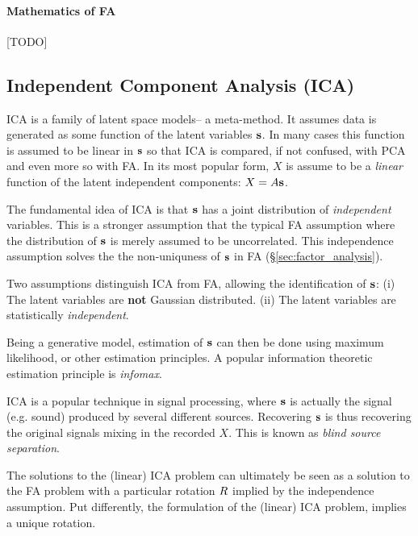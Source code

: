 \paragraph{Mathematics of FA}
[TODO]




\subsection{Independent Component Analysis (ICA)}
\label{sec:ica}

ICA is a family of latent space models-- a meta-method.
It assumes data is generated as some function of the latent variables $\mathbf{s}$. 
In many cases this function is assumed to be linear in $\mathbf{s}$ so that ICA is compared, if not confused, with PCA and even more so with FA. 
In its most popular form, $X$ is assume to be a \emph{linear} function of the latent independent components: $X=A \mathbf{s}$.

The fundamental idea of ICA is that $\mathbf{s}$ has a joint distribution of \emph{independent} variables. 
This is a stronger assumption that the typical FA assumption where the distribution of $\mathbf{s}$ is merely assumed to be uncorrelated. 
This independence assumption solves the the non-uniquness of $\mathbf{s}$ in FA (\S\ref{sec:factor_analysis}).

Two assumptions distinguish ICA from FA, allowing the identification of $\mathbf{s}$: 
(i) The latent variables are \textbf{not} Gaussian distributed.
(ii) The latent variables are statistically \emph{independent}.

Being a generative model, estimation of $\mathbf{s}$ can then be done using maximum likelihood, or other estimation principles. A popular information theoretic estimation principle is \emph{infomax}.



ICA is a popular technique in signal processing, where $\mathbf{s}$ is actually the signal (e.g. sound) produced by several different sources. 
Recovering $\mathbf{s}$ is thus recovering the original signals mixing in the recorded $X$. This is known as \emph{blind source separation}.


\begin{remark}
The solutions to the (linear) ICA problem can ultimately be seen as a solution to the FA problem with a particular rotation $R$ implied by the independence assumption.
Put differently, the formulation of the (linear) ICA problem, implies a unique rotation. 
\end{remark}

